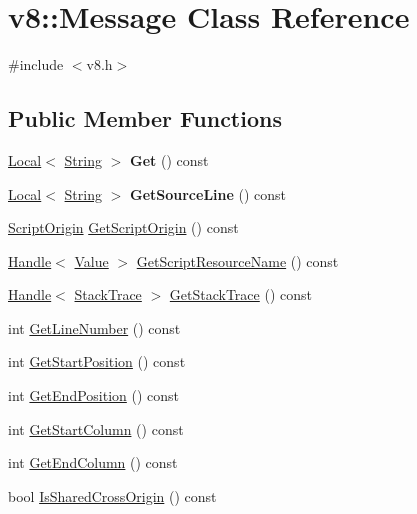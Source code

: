\hypertarget{classv8_1_1_message}{}\section{v8\+:\+:Message Class Reference}
\label{classv8_1_1_message}


{\ttfamily \#include $<$v8.\+h$>$}

\subsection*{Public Member Functions}
\begin{DoxyCompactItemize}
\item 
\hypertarget{classv8_1_1_message_a72f26c7b684bbfbd14d5970849fdf3d2}{}\hyperlink{classv8_1_1_local}{Local}$<$ \hyperlink{classv8_1_1_string}{String} $>$ {\bfseries Get} () const \label{classv8_1_1_message_a72f26c7b684bbfbd14d5970849fdf3d2}

\item 
\hypertarget{classv8_1_1_message_a0d5cceb5128a147818c72b82950e475d}{}\hyperlink{classv8_1_1_local}{Local}$<$ \hyperlink{classv8_1_1_string}{String} $>$ {\bfseries Get\+Source\+Line} () const \label{classv8_1_1_message_a0d5cceb5128a147818c72b82950e475d}

\item 
\hyperlink{classv8_1_1_script_origin}{Script\+Origin} \hyperlink{classv8_1_1_message_ae0fc442f44bd2b600c4d89a50cf3abd9}{Get\+Script\+Origin} () const 
\item 
\hyperlink{classv8_1_1_handle}{Handle}$<$ \hyperlink{classv8_1_1_value}{Value} $>$ \hyperlink{classv8_1_1_message_ac5d31afb758897cd1653c5eb3327a4d6}{Get\+Script\+Resource\+Name} () const 
\item 
\hyperlink{classv8_1_1_handle}{Handle}$<$ \hyperlink{classv8_1_1_stack_trace}{Stack\+Trace} $>$ \hyperlink{classv8_1_1_message_adeffa297a5a28955dd16c084632aa645}{Get\+Stack\+Trace} () const 
\item 
int \hyperlink{classv8_1_1_message_a67f97fd76b8f98ed65743b9615d64a79}{Get\+Line\+Number} () const 
\item 
int \hyperlink{classv8_1_1_message_a31a550a1d3d09a2d72d0742be821956f}{Get\+Start\+Position} () const 
\item 
int \hyperlink{classv8_1_1_message_a50cbec87379e628b1647466926882037}{Get\+End\+Position} () const 
\item 
int \hyperlink{classv8_1_1_message_aab8007ba81d3f195280bce0693810cc2}{Get\+Start\+Column} () const 
\item 
int \hyperlink{classv8_1_1_message_aaf82cd7f7449add5f50d4253499cad05}{Get\+End\+Column} () const 
\item 
bool \hyperlink{classv8_1_1_message_a03228f50c40c45da52f424bdd64598d1}{Is\+Shared\+Cross\+Origin} () const 
\end{DoxyCompactItemize}
